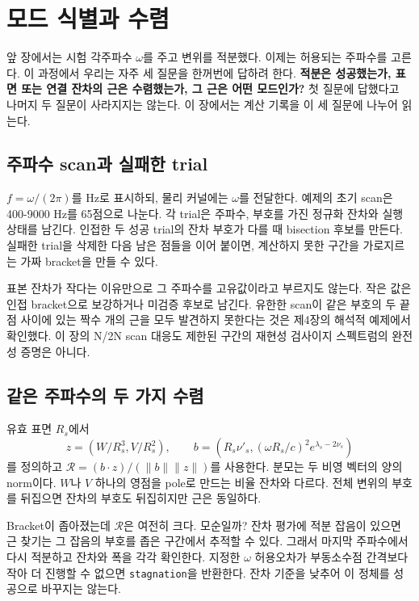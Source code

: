 \documentclass[
  10pt,
  a4paper,
]{article}
\begin{document}

\section{모드 식별과
수렴}\label{uxbaa8uxb4dc-uxc2dduxbcc4uxacfc-uxc218uxb834}

앞 장에서는 시험 각주파수 \(\omega\)를 주고 변위를 적분했다. 이제는
허용되는 주파수를 고른다. 이 과정에서 우리는 자주 세 질문을 한꺼번에
답하려 한다. \textbf{적분은 성공했는가, 표면 또는 연결 잔차의 근은
수렴했는가, 그 근은 어떤 모드인가?} 첫 질문에 답했다고 나머지 두 질문이
사라지지는 않는다. 이 장에서는 계산 기록을 이 세 질문에 나누어 읽는다.

\subsection{주파수 scan과 실패한
trial}\label{uxc8fcuxd30cuxc218-scanuxacfc-uxc2e4uxd328uxd55c-trial}

\(f=\omega/(2\pi)\)를 Hz로 표시하되, 물리 커널에는 \(\omega\)를
전달한다. 예제의 초기 scan은 400-9000 Hz를 65점으로 나눈다. 각 trial은
주파수, 부호를 가진 정규화 잔차와 실행 상태를 남긴다. 인접한 두 성공
trial의 잔차 부호가 다를 때 bisection 후보를 만든다. 실패한 trial을
삭제한 다음 남은 점들을 이어 붙이면, 계산하지 못한 구간을 가로지르는
가짜 bracket을 만들 수 있다.

표본 잔차가 작다는 이유만으로 그 주파수를 고유값이라고 부르지도 않는다.
작은 값은 인접 bracket으로 보강하거나 미검증 후보로 남긴다. 유한한
scan이 같은 부호의 두 끝점 사이에 있는 짝수 개의 근을 모두 발견하지
못한다는 것은 제4장의 해석적 예제에서 확인했다. 이 장의 N/2N scan 대응도
제한된 구간의 재현성 검사이지 스펙트럼의 완전성 증명은 아니다.

\subsection{같은 주파수의 두 가지
수렴}\label{uxac19uxc740-uxc8fcuxd30cuxc218uxc758-uxb450-uxac00uxc9c0-uxc218uxb834}

유효 표면 \(R_s\)에서 \[
z=\left(W/R_s^3,V/R_s^2\right),\qquad
b=\left(R_s\nu'_s,(\omega R_s/c)^2e^{\lambda_s-2\nu_s}\right)
\] 를 정의하고 \(\mathcal R=(b\cdot z)/(\|b\|\|z\|)\)를 사용한다. 분모는
두 비영 벡터의 양의 norm이다. \(W\)나 \(V\) 하나의 영점을 pole로 만드는
비율 잔차와 다르다. 전체 변위의 부호를 뒤집으면 잔차의 부호도 뒤집히지만
근은 동일하다.

Bracket이 좁아졌는데 \(\mathcal R\)은 여전히 크다. 모순일까? 잔차 평가에
적분 잡음이 있으면 근 찾기는 그 잡음의 부호를 좁은 구간에서 추적할 수
있다. 그래서 마지막 주파수에서 다시 적분하고 잔차와 폭을 각각 확인한다.
지정한 \(\omega\) 허용오차가 부동소수점 간격보다 작아 더 진행할 수
없으면 \texttt{stagnation}을 반환한다. 잔차 기준을 낮추어 이 정체를
성공으로 바꾸지는 않는다.
\end{document}
